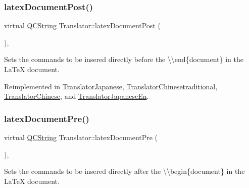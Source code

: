 \mbox{\label{class_translator_a4bcba7a46f227760b534b35760688da6}} 
\subsubsection{\texorpdfstring{latexDocumentPost()}{latexDocumentPost()}}
{\footnotesize\ttfamily virtual \mbox{\hyperlink{class_q_c_string}{Q\+C\+String}} Translator\+::latex\+Document\+Post (\begin{DoxyParamCaption}{ }\end{DoxyParamCaption})\hspace{0.3cm}{\ttfamily [inline]}, {\ttfamily [virtual]}}

Sets the commands to be insered directly before the {\ttfamily \textbackslash{}\textbackslash{}end\{document\}} in the La\+TeX document. 

Reimplemented in \mbox{\hyperlink{class_translator_japanese_a42f015953ee9043a126064c16fccae46}{Translator\+Japanese}}, \mbox{\hyperlink{class_translator_chinesetraditional_a50297eafc68fea68a1db8e384dfd415c}{Translator\+Chinesetraditional}}, \mbox{\hyperlink{class_translator_chinese_a86bc64cb27dd2bac8ae17f9cc51800e8}{Translator\+Chinese}}, and \mbox{\hyperlink{class_translator_japanese_en_a08a448436b8cc3dd28d328ab7145112f}{Translator\+Japanese\+En}}.

\mbox{\label{class_translator_a9fe33a516bc0ec6825a967294dd5d686}} 
\subsubsection{\texorpdfstring{latexDocumentPre()}{latexDocumentPre()}}
{\footnotesize\ttfamily virtual \mbox{\hyperlink{class_q_c_string}{Q\+C\+String}} Translator\+::latex\+Document\+Pre (\begin{DoxyParamCaption}{ }\end{DoxyParamCaption})\hspace{0.3cm}{\ttfamily [inline]}, {\ttfamily [virtual]}}

Sets the commands to be insered directly after the {\ttfamily \textbackslash{}\textbackslash{}begin\{document\}} in the La\+TeX document. 

